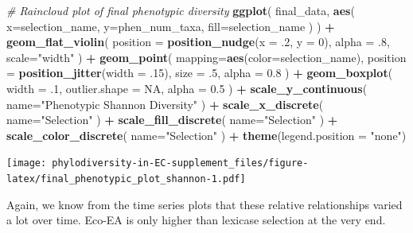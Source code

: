 \documentclass[]{book}
\newenvironment{Shaded}{\begin{snugshade}}{\end{snugshade}}
\newcommand{\CommentTok}[1]{\textcolor[rgb]{0.56,0.35,0.01}{\textit{#1}}}
\newcommand{\DataTypeTok}[1]{\textcolor[rgb]{0.13,0.29,0.53}{#1}}
\newcommand{\DecValTok}[1]{\textcolor[rgb]{0.00,0.00,0.81}{#1}}
\newcommand{\FloatTok}[1]{\textcolor[rgb]{0.00,0.00,0.81}{#1}}
\newcommand{\KeywordTok}[1]{\textcolor[rgb]{0.13,0.29,0.53}{\textbf{#1}}}
\newcommand{\NormalTok}[1]{#1}
\newcommand{\OperatorTok}[1]{\textcolor[rgb]{0.81,0.36,0.00}{\textbf{#1}}}
\newcommand{\OtherTok}[1]{\textcolor[rgb]{0.56,0.35,0.01}{#1}}
\newcommand{\StringTok}[1]{\textcolor[rgb]{0.31,0.60,0.02}{#1}}
\begin{document}
\begin{Shaded}
\begin{Highlighting}[]
\CommentTok{# Raincloud plot of final phenotypic diversity}
\KeywordTok{ggplot}\NormalTok{(}
\NormalTok{    final_data,}
    \KeywordTok{aes}\NormalTok{(}
      \DataTypeTok{x=}\NormalTok{selection_name,}
      \DataTypeTok{y=}\NormalTok{phen_num_taxa,}
      \DataTypeTok{fill=}\NormalTok{selection_name}
\NormalTok{    )}
\NormalTok{  ) }\OperatorTok{+}
\StringTok{  }\KeywordTok{geom_flat_violin}\NormalTok{(}
    \DataTypeTok{position =} \KeywordTok{position_nudge}\NormalTok{(}\DataTypeTok{x =} \FloatTok{.2}\NormalTok{, }\DataTypeTok{y =} \DecValTok{0}\NormalTok{),}
    \DataTypeTok{alpha =} \FloatTok{.8}\NormalTok{,}
    \DataTypeTok{scale=}\StringTok{"width"}
\NormalTok{  ) }\OperatorTok{+}
\StringTok{  }\KeywordTok{geom_point}\NormalTok{(}
    \DataTypeTok{mapping=}\KeywordTok{aes}\NormalTok{(}\DataTypeTok{color=}\NormalTok{selection_name),}
    \DataTypeTok{position =} \KeywordTok{position_jitter}\NormalTok{(}\DataTypeTok{width =} \FloatTok{.15}\NormalTok{),}
    \DataTypeTok{size =} \FloatTok{.5}\NormalTok{,}
    \DataTypeTok{alpha =} \FloatTok{0.8}
\NormalTok{  ) }\OperatorTok{+}
\StringTok{  }\KeywordTok{geom_boxplot}\NormalTok{(}
    \DataTypeTok{width =} \FloatTok{.1}\NormalTok{,}
    \DataTypeTok{outlier.shape =} \OtherTok{NA}\NormalTok{,}
    \DataTypeTok{alpha =} \FloatTok{0.5}
\NormalTok{  ) }\OperatorTok{+}
\StringTok{  }\KeywordTok{scale_y_continuous}\NormalTok{(}
    \DataTypeTok{name=}\StringTok{"Phenotypic Shannon Diversity"}
\NormalTok{  ) }\OperatorTok{+}
\StringTok{  }\KeywordTok{scale_x_discrete}\NormalTok{(}
    \DataTypeTok{name=}\StringTok{"Selection"}
\NormalTok{  ) }\OperatorTok{+}
\StringTok{  }\KeywordTok{scale_fill_discrete}\NormalTok{(}
    \DataTypeTok{name=}\StringTok{"Selection"}
\NormalTok{  ) }\OperatorTok{+}
\StringTok{  }\KeywordTok{scale_color_discrete}\NormalTok{(}
    \DataTypeTok{name=}\StringTok{"Selection"}
\NormalTok{  ) }\OperatorTok{+}
\StringTok{  }\KeywordTok{theme}\NormalTok{(}\DataTypeTok{legend.position =} \StringTok{"none"}\NormalTok{)}
\end{Highlighting}
\end{Shaded}

\texttt{[image: phylodiversity-in-EC-supplement\_files/figure-latex/final\_phenotypic\_plot\_shannon-1.pdf]}

Again, we know from the time series plots that these relative relationships varied a lot over time. Eco-EA is only higher than lexicase selection at the very end.
\end{document}
